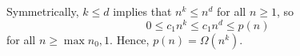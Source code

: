 Symmetrically, $k\le d$ implies that $n^k\le n^d$ for all $n\ge1$, so
\[
    0 \le c_1n^k \le c_1n^d \le p(n)
\]
for all $n\ge\max{n_0,1}$.
Hence, $p(n)=\Omega(n^k)$.

